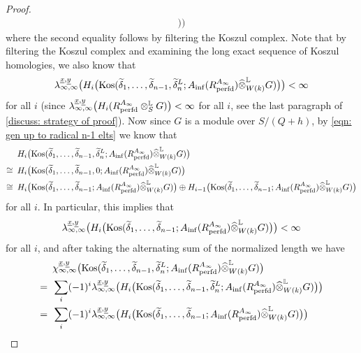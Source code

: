 \documentclass[12pt]{amsart}
\numberwithin{equation}{theorem}
\numberwithin{equation}{theorem}
\newcommand{\perfd}{\textnormal{perfd}}
\newcommand{\Kos}{\textnormal{Kos}}
\begin{document}
\begin{proof}
\begin{align}
)\big)
\end{align}
where the second equality follows by filtering the Koszul complex. Note that by filtering the Koszul complex and examining the long exact sequence of Koszul homologies, we also know that
$$\lambda_{\infty, \infty}^{\underline{x}, \underline{y}}\big(H_i\big(\Kos(\widetilde{\delta}_1,\dots,\widetilde{\delta}_{n-1}, \widetilde{\delta}_n^L; A_{\inf}(R^{A_\infty}_\perfd) \widehat{\otimes}^\myL_{W(k)}G)\big)\big) <\infty$$
for all $i$ (since $\lambda_{\infty,\infty}^{\underline{x},\underline{y}}\big(H_i(R^{A_\infty}_\perfd \otimes^\myL_SG)\big)<\infty$ for all $i$, see the last paragraph of \autoref{discuss: strategy of proof}). Now since $G$ is a module over $S/(Q+h)$, by \autoref{eqn: gen up to radical n-1 elts} we know that 
\begin{align*}
& \,\ H_i\big(\Kos(\widetilde{\delta}_1,\dots,\widetilde{\delta}_{n-1},\widetilde{\delta}_n^L; A_{\inf}(R^{A_\infty}_\perfd) \widehat{\otimes}^\myL_{W(k)}G)\big) \\
\cong & \,\ H_i\big(\Kos(\widetilde{\delta}_1,\dots,\widetilde{\delta}_{n-1}, 0; A_{\inf}(R^{A_\infty}_\perfd) \widehat{\otimes}^\myL_{W(k)}G)\big) \\
\cong & \,\ H_i\big(\Kos(\widetilde{\delta}_1,\dots,\widetilde{\delta}_{n-1}; A_{\inf}(R^{A_\infty}_\perfd) \widehat{\otimes}^\myL_{W(k)}G)\big)  \oplus H_{i-1}\big(\Kos(\widetilde{\delta}_1,\dots,\widetilde{\delta}_{n-1}; A_{\inf}(R^{A_\infty}_\perfd) \widehat{\otimes}^\myL_{W(k)}G)\big)
\end{align*}
for all $i$. In particular, this implies that 
$$\lambda_{\infty, \infty}^{\underline{x}, \underline{y}}\big(H_i\big(\Kos(\widetilde{\delta}_1,\dots,\widetilde{\delta}_{n-1}; A_{\inf}(R^{A_\infty}_\perfd) \widehat{\otimes}^\myL_{W(k)}G)\big)\big) <\infty$$
for all $i$, and after taking the alternating sum of the normalized length we have 
\begin{align}
\label{eqn: Koszul cancelation}
& \,\ \chi_{\infty, \infty}^{\underline{x}, \underline{y}}\big(\Kos(\widetilde{\delta}_1,\dots,\widetilde{\delta}_{n-1},\widetilde{\delta}_n^L; A_{\inf}(R^{A_\infty}_\perfd) \widehat{\otimes}^\myL_{W(k)}G
)\big) \\
= & \,\  \sum_i(-1)^i\lambda_{\infty, \infty}^{\underline{x}, \underline{y}}\big(H_i\big(\Kos(\widetilde{\delta}_1,\dots,\widetilde{\delta}_{n-1}, \widetilde{\delta}_n^L; A_{\inf}(R^{A_\infty}_\perfd) \widehat{\otimes}^\myL_{W(k)}G)\big)\big) \notag\\
= & \,\ \sum_i(-1)^i\lambda_{\infty, \infty}^{\underline{x}, \underline{y}}\big(H_i\big(\Kos(\widetilde{\delta}_1,\dots,\widetilde{\delta}_{n-1}; A_{\inf}(R^{A_\infty}_\perfd) \widehat{\otimes}^\myL_{W(k)}G)\big)\big) \notag \\

\end{align}
\end{proof}
\end{document}
